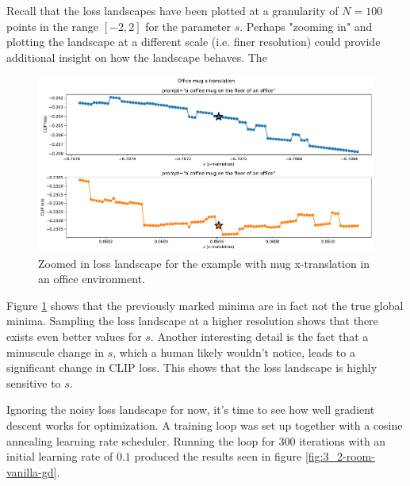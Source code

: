 Recall that the loss landscapes have been plotted at a granularity of $N=100$ points in the range $[-2,2]$ for the parameter $s$. Perhaps "zooming in" and plotting the landscape at a different scale (i.e. finer resolution) could provide additional insight on how the landscape behaves. The 
\begin{figure}[H]
    \centering
    \includegraphics[width=1.0\textwidth]{figures/3_2-room-translation-optimal-images-zoomed.pdf}
    \caption{Zoomed in loss landscape for the example with mug x-translation in an office environment.}
    \label{fig:3_2-scale-optimal-images-zoomed}
\end{figure}
Figure \ref{fig:3_2-scale-optimal-images-zoomed} shows that the previously marked minima are in fact not the true global minima. Sampling the loss landscape at a higher resolution shows that there exists even better values for $s$. Another interesting detail is the fact that a minuscule change in $s$, which a human likely wouldn't notice, leads to a significant change in CLIP loss. This shows that the loss landscape is highly sensitive to $s$.

Ignoring the noisy loss landscape for now, it's time to see how well gradient descent works for optimization. A training loop was set up together with a cosine annealing learning rate scheduler. Running the loop for 300 iterations with an initial learning rate of $0.1$ produced the results seen in figure \ref{fig:3_2-room-vanilla-gd}.

